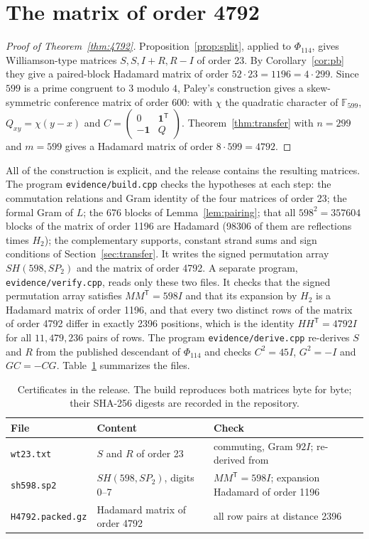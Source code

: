 \documentclass[10pt]{article}
\theoremstyle{definition}
\theoremstyle{remark}
\newcommand{\tr}{^{\mathsf T}}
\newcommand{\one}{\mathbf 1}
\begin{document}
\section{The matrix of order 4792}\label{sec:verify}
\begin{proof}[Proof of Theorem~\ref{thm:4792}]
Proposition~\ref{prop:split}, applied to $\Phi_{114}$, gives Williamson-type matrices $S,S,I+R,R-I$ of order 23. By Corollary~\ref{cor:pb} they give a paired-block Hadamard matrix of order $52\cdot23=1196=4\cdot299$. Since $599$ is a prime congruent to $3$ modulo $4$, Paley's construction gives a skew-symmetric conference matrix of order 600: with $\chi$ the quadratic character of $\mathbb F_{599}$, $Q_{xy}=\chi(y-x)$ and $C=\left(\begin{smallmatrix}0&\one\tr\\-\one&Q\end{smallmatrix}\right)$. Theorem~\ref{thm:transfer} with $n=299$ and $m=599$ gives a Hadamard matrix of order $8\cdot599=4792$.
\end{proof}

All of the construction is explicit, and the release contains the resulting matrices. The program \texttt{evidence/build.cpp} checks the hypotheses at each step: the commutation relations and Gram identity of the four matrices of order 23; the formal Gram of $L$; the 676 blocks of Lemma~\ref{lem:pairing}; that all $598^2=357604$ blocks of the matrix of order 1196 are Hadamard (98306 of them are reflections times $H_2$); the complementary supports, constant strand sums and sign conditions of Section~\ref{sec:transfer}. It writes the signed permutation array $SH(598,SP_2)$ and the matrix of order 4792. A separate program, \texttt{evidence/verify.cpp}, reads only these two files. It checks that the signed permutation array satisfies $MM\tr=598I$ and that its expansion by $H_2$ is a Hadamard matrix of order 1196, and that every two distinct rows of the matrix of order 4792 differ in exactly 2396 positions, which is the identity $HH\tr=4792I$ for all $11{,}479{,}236$ pairs of rows. The program \texttt{evidence/derive.cpp} re-derives $S$ and $R$ from the published descendant of $\Phi_{114}$ and checks $C^2=45I$, $G^2=-I$ and $GC=-CG$. Table~\ref{tab:checks} summarizes the files.

\begin{table}[h]
\centering\small
\begin{tabular}{@{}lll@{}}
\toprule
File & Content & Check\\
\midrule
\texttt{wt23.txt} & $S$ and $R$ of order 23 & commuting, Gram $92I$; re-derived from~\cite{Ma23data}\\
\texttt{sh598.sp2} & $SH(598,SP_2)$, digits 0--7 & $MM\tr=598I$; expansion Hadamard of order 1196\\
\texttt{H4792.packed.gz} & Hadamard matrix of order 4792 & all row pairs at distance 2396\\
\bottomrule
\end{tabular}
\caption{Certificates in the release. The build reproduces both matrices byte for byte; their SHA-256 digests are recorded in the repository.}\label{tab:checks}
\end{table}
\end{document}

